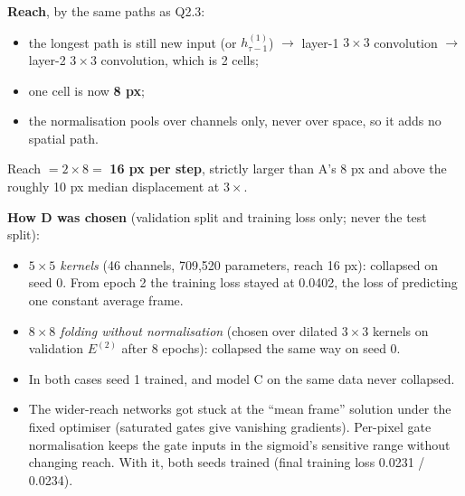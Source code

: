 \documentclass[11pt]{article}
\begin{document}
\textbf{Reach}, by the same paths as Q2.3:
\begin{itemize}
  \item the longest path is still new input (or $h^{(1)}_{\tau-1}$) $\to$ layer-1 $3\times3$ convolution $\to$ layer-2 $3\times3$ convolution, which is 2 cells;
  \item one cell is now \textbf{8 px};
  \item the normalisation pools over channels only, never over space, so it adds no spatial path.
\end{itemize}
Reach $=2\times8=$ \textbf{16 px per step}, strictly larger than A's 8 px and above the roughly 10 px median displacement at $3\times$.

\textbf{How D was chosen} (validation split and training loss only; never the test split):
\begin{itemize}
  \item \emph{$5\times5$ kernels} (46 channels, 709,520 parameters, reach 16 px): collapsed on seed 0. From epoch 2 the training loss stayed at 0.0402, the loss of predicting one constant average frame.
  \item \emph{$8\times8$ folding without normalisation} (chosen over dilated $3\times3$ kernels on validation $E^{(2)}$ after 8 epochs): collapsed the same way on seed 0.
  \item In both cases seed 1 trained, and model C on the same data never collapsed.
  \item The wider-reach networks got stuck at the ``mean frame'' solution under the fixed optimiser (saturated gates give vanishing gradients). Per-pixel gate normalisation keeps the gate inputs in the sigmoid's sensitive range without changing reach. With it, both seeds trained (final training loss 0.0231 / 0.0234).
\end{itemize}
\end{document}
